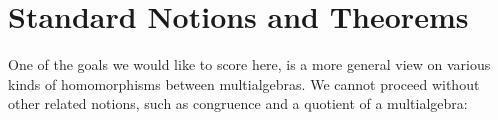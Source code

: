 %
%
%
%
%
%
%


%
%
\section{Standard Notions and Theorems}

One of the goals we would like to score here, is a more general view
on various kinds of homomorphisms between multialgebras. We cannot
proceed without other related notions, such as congruence and a
quotient of a multialgebra:

